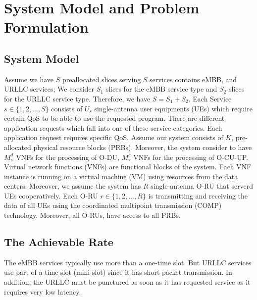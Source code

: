 \documentclass[conference]{IEEEtran}
\begin{document}
\section{System Model and Problem Formulation}
\subsection{System Model}
Assume we have $S$ preallocated slices serving $S$ services contains eMBB, and URLLC services; We consider $S_1$ slices for the eMBB service type and $S_2$ slices for the URLLC service type. Therefore, we have $S=S_1+S_2$.
Each Service $s\in \{1,2,...,S\} $ consists of $U_{s}$ single-antenna user equipments (UEs) which require certain QoS to be able to use the requested program.
There are different application requests which fall into one of these service categories. Each application request requires specific QoS.
Assume our system consists of $K$, pre-allocated physical resource blocks (PRBs). Moreover, the system  consider to have $M_s^{d}$ VNFs for the processing of O-DU, $M_s^{c}$ VNFs for the processing of O-CU-UP. 
Virtual network functions (VNFs) are functional blocks of the system. Each VNF instance is running on a virtual machine (VM) using resources from the data centers. 
Moreover, we assume the system has $R$ single-antenna O-RU that serverd UEs cooperatively. Each O-RU $r \in \{1,2,...,R \}$ is transmitting and receiving the data of all UEs using the coordinated multipoint transmission (COMP) technology. Moreover, all O-RUs, have access to all PRBs.
\subsection{The Achievable Rate}
The eMBB services typically use more than a one-time slot. But URLLC services use part of a time slot (mini-slot) since it has short packet transmission. In addition, the URLLC must be punctured as soon as it has requested service as it requires very low latency.
\end{document}
